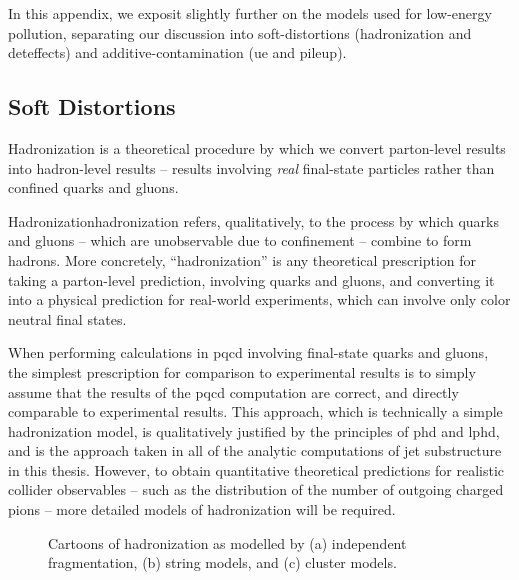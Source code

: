 \begin{subappendices}
In this appendix, we exposit slightly further on the models used for low-energy pollution, separating our discussion into \glspl{soft-distortion} (\gls{hadronization} and \gls{deteffects}) and \gls{additive-contamination} (\gls{ue} and \gls{pileup}).

\subsection{Soft Distortions}
\label{app:soft-distortions}

Hadronization is a theoretical procedure by which we convert parton-level results into hadron-level results -- results involving \textit{real} final-state particles rather than confined quarks and gluons.

\begin{definitionbox}{Hadronization}{hadronization}
     refers, qualitatively, to the process by which quarks and gluons -- which are unobservable due to confinement -- combine to form hadrons.
    More concretely, ``hadronization'' is any theoretical prescription for taking a parton-level prediction, involving quarks and gluons, and converting it into a physical prediction for real-world experiments, which can involve only color neutral final states.
\end{definitionbox}


When performing calculations in \gls{pqcd} involving final-state quarks and gluons, the simplest prescription for comparison to experimental results is to simply assume that the results of the \gls{pqcd} computation are correct, and directly comparable to experimental results.
%
This approach, which is technically a simple hadronization model, is qualitatively justified by the principles of \gls{phd} and \gls{lphd}, and is the approach taken in all of the analytic computations of jet substructure in this thesis.
%
However, to obtain quantitative theoretical predictions for realistic collider observables -- such as the distribution of the number of outgoing charged pions -- more detailed models of hadronization will be required.



\begin{figure}[]
    \centering
    \caption[Cartoons of common hadronization models.]{
        Cartoons of hadronization as modelled by (a) independent fragmentation, (b) string models, and (c) cluster models.
    }
    \label{fig:cms-cartoon}
\end{figure}





\end{subappendices}
